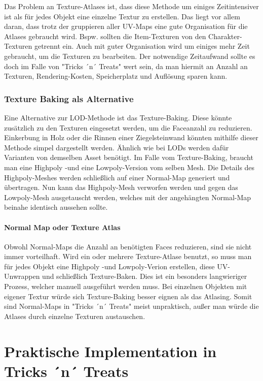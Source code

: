 Das Problem an Texture-Atlases ist, dass diese Methode um einiges Zeitintensiver ist als für jedes Objekt eine einzelne Textur zu erstellen. Das liegt vor allem daran, dass trotz der gruppieren aller UV-Maps eine gute Organisation für die Atlases gebraucht wird. Bspw. sollten die Item-Texturen von den Charakter-Texturen getrennt ein. Auch mit guter Organisation wird um einiges mehr Zeit gebraucht, um die Texturen zu bearbeiten. Der notwendige Zeitaufwand sollte es doch im Falle von "Tricks ´n´ Treats" wert sein, da man hiermit an Anzahl an Texturen, Rendering-Kosten, Speicherplatz und Auflösung sparen kann.

\subsection{Texture Baking als Alternative}

Eine Alternative zur LOD-Methode ist das Texture-Baking. Diese könnte zusätzlich zu den Texturen eingesetzt werden, um die Faceanzahl zu reduzieren. Einkerbung in Holz oder die Rinnen einer Ziegelsteinwand könnten mithilfe dieser Methode simpel dargestellt werden. Ähnlich wie bei LODs werden dafür Varianten von demselben Asset benötigt. Im Falle vom Texture-Baking, braucht man eine Highpoly -und eine Lowpoly-Version vom selben Mesh. Die Details des Highpoly-Meshes werden schließlich auf einer Normal-Map generiert und übertragen. Nun kann das Highpoly-Mesh verworfen werden und gegen das Lowpoly-Mesh ausgetauscht werden, welches mit der angehängten Normal-Map beinahe identisch aussehen sollte.

\subsubsection{Normal Map oder Texture Atlas}

Obwohl Normal-Maps die Anzahl an benötigten Faces reduzieren, sind sie nicht immer vorteilhaft. Wird ein oder mehrere Texture-Atlase benutzt, so muss man für jedes Objekt eine Highpoly -und Lowpoly-Verion erstellen, diese UV-Unwrappen und schließlich Texture-Baken. Dies ist ein besonders langwieriger Prozess, welcher manuell ausgeführt werden muss. Bei einzelnen Objekten mit eigener Textur würde sich Texture-Baking besser eignen als das Atlasing. Somit sind Normal-Maps in "Tricks ´n´ Treats" meist unpraktisch, außer man würde die Atlases durch einzelne Texturen austauschen.

\chapter{Praktische Implementation in Tricks ´n´ Treats}

